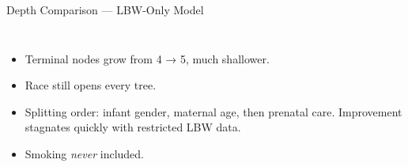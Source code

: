 \documentclass[aspectratio=169,professionalfonts]{beamer}
\begin{document}
\begin{frame}{Depth Comparison — LBW-Only Model}
\scriptsize
\begin{columns}[T]

\centering
{}   %

\begin{itemize}\itemsep2pt
    \item Terminal nodes grow from 4 → 5, much shallower.  
    \item Race still opens every tree.
    \item Splitting order: infant gender, maternal age, then prenatal care. Improvement stagnates quickly with restricted LBW data.
  \item Smoking \emph{never} included. 
\end{itemize}

\end{columns}
\end{frame}


\end{document}
